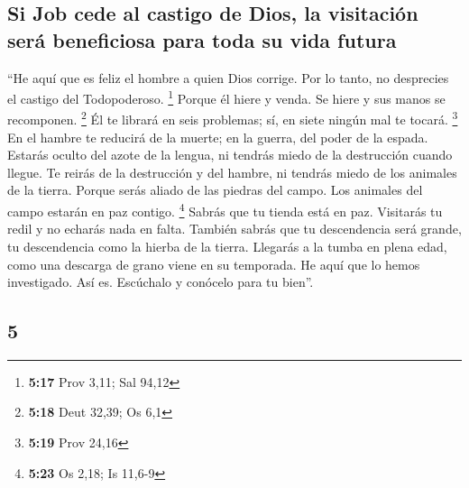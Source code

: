 \begin{paracol}{2}
\hypertarget{si-job-cede-al-castigo-de-dios-la-visitaciuxf3n-seruxe1-beneficiosa-para-toda-su-vida-futura}{%
\subsection{Si Job cede al castigo de Dios, la visitación será
beneficiosa para toda su vida
futura}\label{si-job-cede-al-castigo-de-dios-la-visitaciuxf3n-seruxe1-beneficiosa-para-toda-su-vida-futura}}

 ``He aquí que es feliz el hombre a quien Dios corrige.
Por lo tanto, no desprecies el castigo del Todopoderoso. \footnote{\textbf{5:17}
  Prov 3,11; Sal 94,12}  Porque él hiere y venda. Se
hiere y sus manos se recomponen. \footnote{\textbf{5:18} Deut 32,39; Os
  6,1}  Él te librará en seis problemas; sí, en siete
ningún mal te tocará. \footnote{\textbf{5:19} Prov 24,16}
 En el hambre te reducirá de la muerte; en la guerra, del
poder de la espada.  Estarás oculto del azote de la
lengua, ni tendrás miedo de la destrucción cuando llegue.
 Te reirás de la destrucción y del hambre, ni tendrás
miedo de los animales de la tierra.  Porque serás aliado
de las piedras del campo. Los animales del campo estarán en paz contigo.
\footnote{\textbf{5:23} Os 2,18; Is 11,6-9}  Sabrás que
tu tienda está en paz. Visitarás tu redil y no echarás nada en falta.
 También sabrás que tu descendencia será grande, tu
descendencia como la hierba de la tierra.  Llegarás a la
tumba en plena edad, como una descarga de grano viene en su temporada.
 He aquí que lo hemos investigado. Así es. Escúchalo y
conócelo para tu bien''.

\switchcolumn
\begin{otherlanguage}{english}

\hypertarget{section-9}{%
\section{5}\label{section-9}}


\end{otherlanguage}
\end{paracol}
